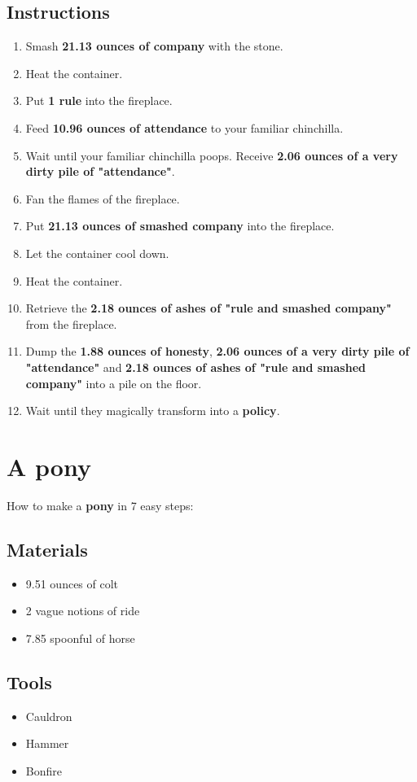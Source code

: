 \documentclass{article}
\begin{document}
\subsection{Instructions}\begin{enumerate}
\item 
Smash \textbf{21.13 ounces of company} with the stone.
\item 
Heat the container.
\item 
Put \textbf{1 rule} into the fireplace.
\item 
Feed \textbf{10.96 ounces of attendance} to your familiar chinchilla.
\item 
Wait until your familiar chinchilla poops. Receive \textbf{2.06 ounces of a very dirty pile of "attendance"}.
\item 
Fan the flames of the fireplace.
\item 
Put \textbf{21.13 ounces of smashed company} into the fireplace.
\item 
Let the container cool down.
\item 
Heat the container.
\item 
Retrieve the \textbf{2.18 ounces of ashes of "rule and smashed company"} from the fireplace.
\item 
Dump the \textbf{1.88 ounces of honesty}, \textbf{2.06 ounces of a very dirty pile of "attendance"} and \textbf{2.18 ounces of ashes of "rule and smashed company"} into a pile on the floor.
\item 
Wait until they magically transform into a \textbf{policy}.
\end{enumerate}
\newpage
\section{A pony}How to make a \textbf{pony} in 7 easy steps:

\subsection{Materials}\begin{itemize}
\item 
9.51 ounces of colt
\item 
2 vague notions of ride
\item 
7.85 spoonful of horse
\end{itemize}
\subsection{Tools}\begin{itemize}
\item 
Cauldron
\item 
Hammer
\item 
Bonfire
\end{itemize}
\end{document}
